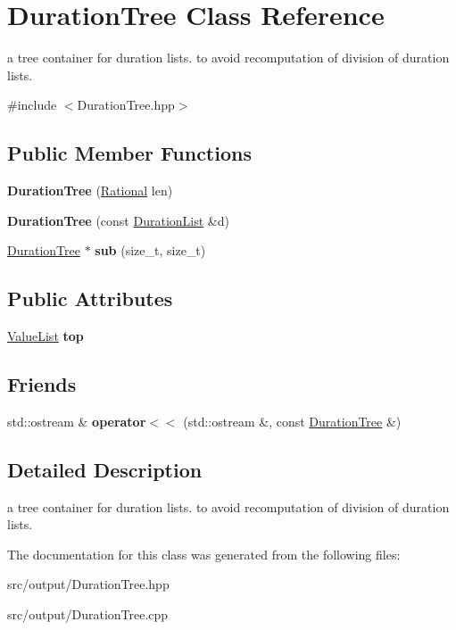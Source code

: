 \hypertarget{classDurationTree}{}\section{Duration\+Tree Class Reference}
\label{classDurationTree}


a tree container for duration lists. to avoid recomputation of division of duration lists.  




{\ttfamily \#include $<$Duration\+Tree.\+hpp$>$}

\subsection*{Public Member Functions}
\begin{DoxyCompactItemize}
\item 
\mbox{\label{classDurationTree_a0bfd7d1de526da6f0e7f8bdbd0c63416}} 
{\bfseries Duration\+Tree} (\mbox{\hyperlink{classRational}{Rational}} len)
\item 
{\bfseries Duration\+Tree} (const \mbox{\hyperlink{classDurationList}{Duration\+List}} \&d)
\item 
\mbox{\hyperlink{classDurationTree}{Duration\+Tree}} $\ast$ {\bfseries sub} (size\+\_\+t, size\+\_\+t)
\end{DoxyCompactItemize}
\subsection*{Public Attributes}
\begin{DoxyCompactItemize}
\item 
\mbox{\label{classDurationTree_a5bc3a3111a608d2992accf0b6d98da40}} 
\mbox{\hyperlink{classValueList}{Value\+List}} {\bfseries top}
\end{DoxyCompactItemize}
\subsection*{Friends}
\begin{DoxyCompactItemize}
\item 
\mbox{\label{classDurationTree_a00e14b0d27026547b25d2ba5d9a4c058}} 
std\+::ostream \& {\bfseries operator$<$$<$} (std\+::ostream \&, const \mbox{\hyperlink{classDurationTree}{Duration\+Tree}} \&)
\end{DoxyCompactItemize}


\subsection{Detailed Description}
a tree container for duration lists. to avoid recomputation of division of duration lists. 

The documentation for this class was generated from the following files\+:\begin{DoxyCompactItemize}
\item 
src/output/Duration\+Tree.\+hpp\item 
src/output/Duration\+Tree.\+cpp\end{DoxyCompactItemize}
